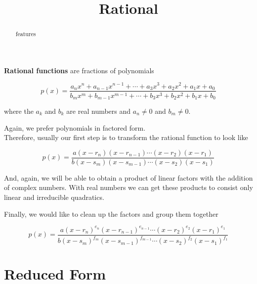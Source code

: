 \documentclass{ximera}
\title{Rational}
\begin{document}
\begin{abstract}
features
\end{abstract}
\maketitle








\begin{definition}

\textbf{Rational functions} are fractions of polynomials




\[ p(x) =   \frac{ a_n x^n + a_{n-1} x^{n-1} + \cdots + a_3 x^3 + a_2 x^2 + a_1 x + a_0  } { b_m x^m + b_{m-1} x^{m-1} + \cdots + b_3 x^3 + b_2 x^2 + b_1 x + b_0 }   \]



where the $a_k$ and $b_k$ are real numbers and $a_n \ne 0$ and $b_m \ne 0$.


\end{definition}





Again, we prefer polynomials in factored form.  \\


Therefore, usually our first step is to transform the rational function to look like



\[ p(x) =   \frac{ a (x-r_n)(x-r_{n-1})  \cdots (x-r_2)(x-r_1)  } { b (x-s_m)(x-s_{m-1})  \cdots (x-s_2)(x-s_1) }   \]




And, again, we will be able to obtain a product of linear factors with the addition of complex numbers.  With real numbers we can get these products to consist only linear and irreducible quadratics.




Finally, we would like to clean up the factors and group them together






\[ p(x) =   \frac{ a (x-r_n)^{e_n} (x-r_{n-1})^{e_{n-1}}  \cdots (x-r_2)^{e_2} (x-r_1)^{e_1}  } { b (x-s_m)^{f_m} (x-s_{m-1})^{f_{m-1}}  \cdots (x-s_2)^{f_2} (x-s_1)^{f_1} }   \]






\section{Reduced Form}
\end{document}

